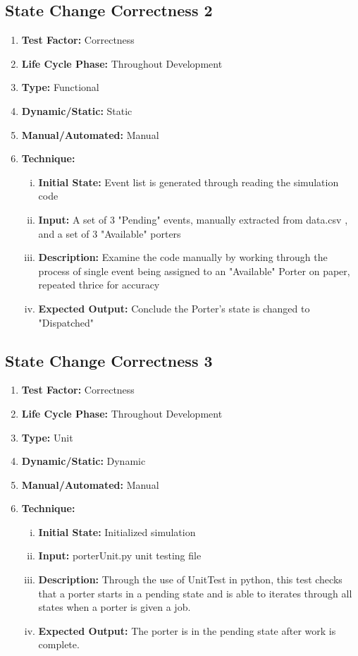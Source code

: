 \documentclass[paper=letter, fontsize=10pt]{scrartcl}
\numberwithin{equation}{section}		%
\numberwithin{figure}{section}			%
\numberwithin{table}{section}				%
\begin{document}
\subsection{State Change Correctness 2}
\begin{enumerate}[]
	\item \textbf{Test Factor:} Correctness
	\item \textbf{Life Cycle Phase:} Throughout Development
	\item \textbf{Type:} Functional
	\item \textbf{Dynamic/Static:} Static
	\item \textbf{Manual/Automated:} Manual
	\item \textbf{Technique:}
		\begin{enumerate}[(i)]
			\item \textbf{Initial State:} Event list is generated through reading the simulation code
			\item \textbf{Input:} A set of 3 "Pending" events, manually extracted from data.csv , and a set of 3 "Available" porters  
			\item \textbf{Description:} Examine the code manually by working through the process of single event being assigned to an "Available" Porter on paper, repeated thrice for accuracy
			\item \textbf{Expected Output:} Conclude the Porter's state is changed to "Dispatched"
		\end{enumerate}
\end{enumerate}

\subsection{State Change Correctness 3}
\begin{enumerate}[]
	\item \textbf{Test Factor:} Correctness
	\item \textbf{Life Cycle Phase:} Throughout Development
	\item \textbf{Type:} Unit
	\item \textbf{Dynamic/Static:} Dynamic
	\item \textbf{Manual/Automated:} Manual
	\item \textbf{Technique:}
		\begin{enumerate}[(i)]
			\item \textbf{Initial State:} Initialized simulation
			\item \textbf{Input:} porterUnit.py unit testing file
			\item \textbf{Description:} Through the use of UnitTest in python, this test checks that a porter starts in a pending state and is able to iterates through all states when a porter is given a job.
			\item \textbf{Expected Output:} The porter is in the pending state after work is complete.
		\end{enumerate}
\end{enumerate}
\end{document}
